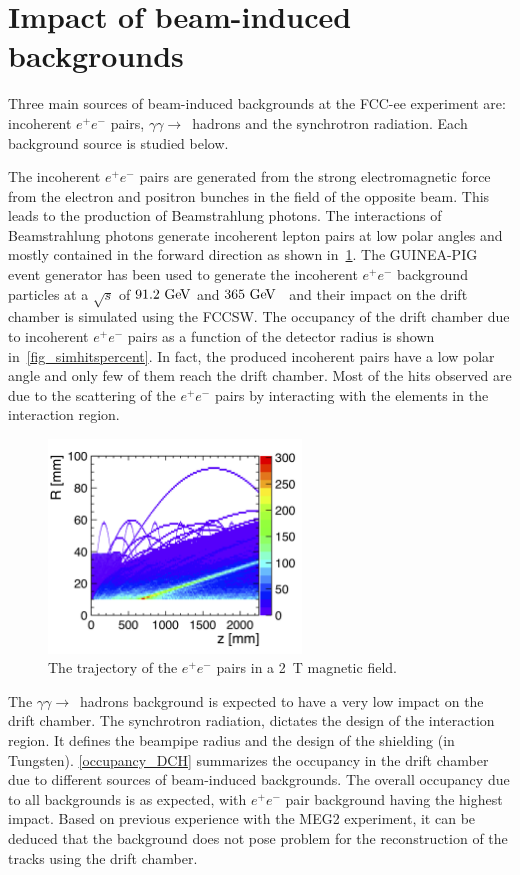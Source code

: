 \section{Impact of beam-induced backgrounds}
Three main sources of beam-induced backgrounds at the FCC-ee experiment are: incoherent $e^+e^-$ pairs, $\gamma\gamma\rightarrow$~hadrons and the synchrotron radiation. Each background source is studied below.

The incoherent $e^+e^-$ pairs are generated from the strong electromagnetic force from the electron and positron bunches in the field of the opposite beam. This leads to the production of Beamstrahlung photons. The interactions of Beamstrahlung photons generate incoherent lepton pairs at low polar angles and mostly contained in the forward direction as shown in~\cref{fig_pairbcg}. The \textsc{GUINEA-PIG}~\cite{Schulte:382453} event generator has been used to generate the incoherent $e^+e^-$ background particles at a $\sqrt{s}$ of $91.2\,\mathrm{\,Ge\kern -0.1em V}$ and $365\,\mathrm{\,Ge\kern -0.1em V}$~\cite{Benedikt:2651299} and their impact on the drift chamber is simulated using the FCCSW. The occupancy of the drift chamber due to incoherent $e^+e^-$ pairs as a function of the detector radius is shown in~\cref{fig_simhitspercent}. In fact, the produced incoherent pairs have a low polar angle and only few of them reach the drift chamber. Most of the hits observed are due to the scattering of the $e^+e^-$ pairs by interacting with the elements in the interaction region.


\begin{figure}[ht]
\centering
\includegraphics[width=0.6\textwidth]{figures/pairs_R_Z.png}
\caption{The trajectory of the $e^+e^-$ pairs in a 2~T magnetic field.}
\label{fig_pairbcg}
\end{figure}



The $\gamma\gamma\rightarrow$~hadrons background is expected to have a very low impact on the drift chamber. The synchrotron radiation, dictates the design of the interaction region. It defines the beampipe radius and the design of the shielding (in Tungsten).
\cref{occupancy_DCH} summarizes the occupancy in the drift chamber due to different sources of beam-induced backgrounds. The overall occupancy due to all backgrounds is as expected, with $e^+e^-$ pair background having the highest impact. Based on previous experience with the MEG2 experiment, it can be deduced that the background does not pose problem for the reconstruction of the tracks using the drift chamber.

